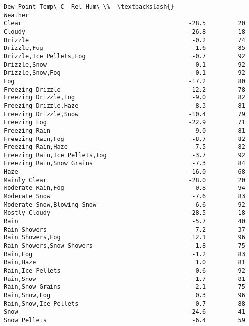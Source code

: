 \documentclass[11pt]{article}
\begin{document}
\begin{tcolorbox}[breakable, size=fbox, boxrule=.5pt, pad at break*=1mm, opacityfill=0]
\begin{Verbatim}[commandchars=\\\{\}]
                                         Dew Point Temp\_C  Rel Hum\_\%  \textbackslash{}
Weather
Clear                                               -28.5         20
Cloudy                                              -26.8         18
Drizzle                                              -0.2         74
Drizzle,Fog                                          -1.6         85
Drizzle,Ice Pellets,Fog                              -0.7         92
Drizzle,Snow                                          0.1         92
Drizzle,Snow,Fog                                     -0.1         92
Fog                                                 -17.2         80
Freezing Drizzle                                    -12.2         78
Freezing Drizzle,Fog                                 -9.0         82
Freezing Drizzle,Haze                                -8.3         81
Freezing Drizzle,Snow                               -10.4         79
Freezing Fog                                        -22.9         71
Freezing Rain                                        -9.0         81
Freezing Rain,Fog                                    -8.7         82
Freezing Rain,Haze                                   -7.5         82
Freezing Rain,Ice Pellets,Fog                        -3.7         92
Freezing Rain,Snow Grains                            -7.3         84
Haze                                                -16.0         68
Mainly Clear                                        -28.0         20
Moderate Rain,Fog                                     0.8         94
Moderate Snow                                        -7.6         83
Moderate Snow,Blowing Snow                           -6.6         92
Mostly Cloudy                                       -28.5         18
Rain                                                 -5.7         40
Rain Showers                                         -7.2         37
Rain Showers,Fog                                     12.1         96
Rain Showers,Snow Showers                            -1.8         75
Rain,Fog                                             -1.2         83
Rain,Haze                                             1.0         81
Rain,Ice Pellets                                     -0.6         92
Rain,Snow                                            -1.7         81
Rain,Snow Grains                                     -2.1         75
Rain,Snow,Fog                                         0.3         96
Rain,Snow,Ice Pellets                                -0.7         88
Snow                                                -24.6         41
Snow Pellets                                         -6.4         59

\end{Verbatim}
\end{tcolorbox}
\end{document}
